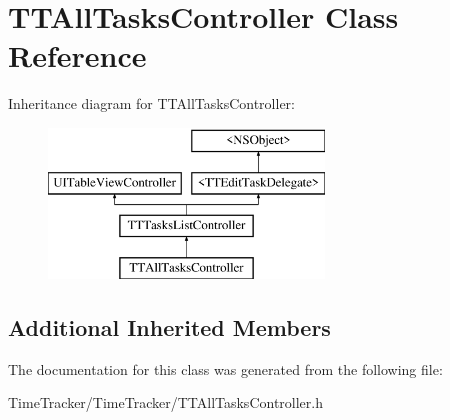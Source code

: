 \hypertarget{interface_t_t_all_tasks_controller}{\section{T\-T\-All\-Tasks\-Controller Class Reference}
\label{interface_t_t_all_tasks_controller}
}
Inheritance diagram for T\-T\-All\-Tasks\-Controller\-:\begin{figure}[H]
\begin{center}
\leavevmode
\includegraphics[height=4.000000cm]{interface_t_t_all_tasks_controller}
\end{center}
\end{figure}
\subsection*{Additional Inherited Members}


The documentation for this class was generated from the following file\-:\begin{DoxyCompactItemize}
\item 
Time\-Tracker/\-Time\-Tracker/T\-T\-All\-Tasks\-Controller.\-h\end{DoxyCompactItemize}
